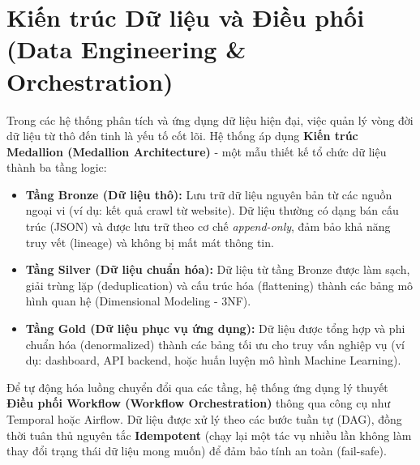 \section{Kiến trúc Dữ liệu và Điều phối (Data Engineering \& Orchestration)}
Trong các hệ thống phân tích và ứng dụng dữ liệu hiện đại, việc quản lý vòng đời dữ liệu từ thô đến tinh là yếu tố cốt lõi. Hệ thống áp dụng \textbf{Kiến trúc Medallion (Medallion Architecture)} - một mẫu thiết kế tổ chức dữ liệu thành ba tầng logic:
\begin{itemize}
    \item \textbf{Tầng Bronze (Dữ liệu thô):} Lưu trữ dữ liệu nguyên bản từ các nguồn ngoại vi (ví dụ: kết quả crawl từ website). Dữ liệu thường có dạng bán cấu trúc (JSON) và được lưu trữ theo cơ chế \textit{append-only}, đảm bảo khả năng truy vết (lineage) và không bị mất mát thông tin.
    \item \textbf{Tầng Silver (Dữ liệu chuẩn hóa):} Dữ liệu từ tầng Bronze được làm sạch, giải trùng lặp (deduplication) và cấu trúc hóa (flattening) thành các bảng mô hình quan hệ (Dimensional Modeling - 3NF).
    \item \textbf{Tầng Gold (Dữ liệu phục vụ ứng dụng):} Dữ liệu được tổng hợp và phi chuẩn hóa (denormalized) thành các bảng tối ưu cho truy vấn nghiệp vụ (ví dụ: dashboard, API backend, hoặc huấn luyện mô hình Machine Learning).
\end{itemize}

Để tự động hóa luồng chuyển đổi qua các tầng, hệ thống ứng dụng lý thuyết \textbf{Điều phối Workflow (Workflow Orchestration)} thông qua công cụ như Temporal hoặc Airflow. Dữ liệu được xử lý theo các bước tuần tự (DAG), đồng thời tuân thủ nguyên tắc \textbf{Idempotent} (chạy lại một tác vụ nhiều lần không làm thay đổi trạng thái dữ liệu mong muốn) để đảm bảo tính an toàn (fail-safe).

